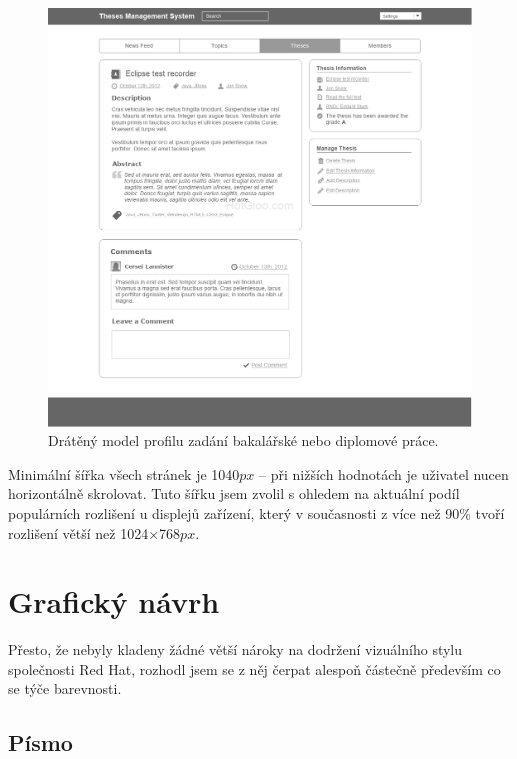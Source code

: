 \begin{figure}[htbp]
    \centering
    \includegraphics[width=\textwidth]{images/main-layout.png}
    \caption{Drátěný model profilu zadání bakalářské nebo diplomové práce.}
    \label{img:layout1}
\end{figure}

Minimální šířka všech stránek je 1040$px$ -- při nižších hodnotách je uživatel nucen horizontálně skrolovat. Tuto šířku jsem zvolil s ohledem na aktuální podíl populárních rozlišení u displejů zařízení, který v současnosti z více než 90\% tvoří rozlišení větší než 1024$\times$768$px$\footnotemark[1].


\section{Grafický návrh}

Přesto, že nebyly kladeny žádné větší nároky na dodržení vizuálního stylu společnosti Red Hat, rozhodl jsem se z něj čerpat alespoň částečně především co se týče barevnosti.

\subsection{Písmo}

